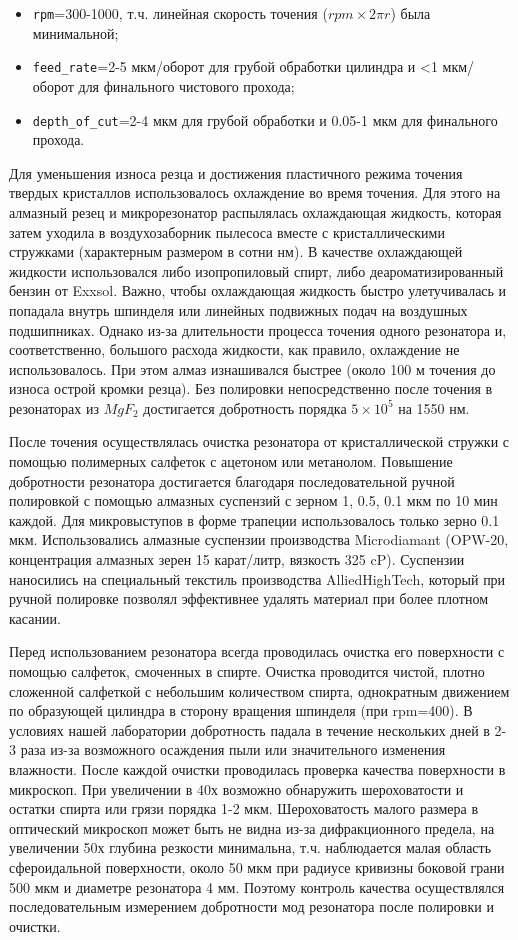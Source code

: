 \begin{itemize}
    \item \texttt{rpm}=300-1000, т.ч. линейная скорость точения ($rpm\times 2\pi r$) была минимальной;
    \item \texttt{feed\_rate}=2-5 мкм/оборот для грубой обработки цилиндра и <1 мкм/оборот для финального чистового прохода;
    \item \texttt{depth\_of\_cut}=2-4 мкм для грубой обработки и 0.05-1 мкм для финального прохода.
\end{itemize}

Для уменьшения износа резца и достижения пластичного режима точения твердых кристаллов использовалось охлаждение во время точения. Для этого на алмазный резец и микрорезонатор распылялась охлаждающая жидкость, которая затем уходила в воздухозаборник пылесоса вместе с кристаллическими стружками (характерным размером в сотни нм). В качестве охлаждающей жидкости использовался либо изопропиловый спирт, либо деароматизированный бензин от Exxsol. Важно, чтобы охлаждающая жидкость быстро улетучивалась и попадала внутрь шпинделя или линейных подвижных подач на воздушных подшипниках. Однако из-за длительности процесса точения одного резонатора и, соответственно, большого расхода жидкости, как правило, охлаждение не использовалось. При этом алмаз изнашивался быстрее (около 100 м точения до износа острой кромки резца). Без полировки непосредственно после точения в резонаторах из $MgF_2$ достигается добротность порядка $5\times10^5$ на 1550 нм.

После точения осуществлялась очистка резонатора от кристаллической стружки с помощью полимерных салфеток с ацетоном или метанолом. Повышение добротности резонатора достигается благодаря последовательной ручной полировкой с помощью алмазных суспензий с зерном 1, 0.5, 0.1 мкм по 10 мин каждой. Для микровыступов в форме трапеции использовалось только зерно 0.1 мкм. Использовались алмазные суспензии производства Microdiamant (OPW-20, концентрация алмазных зерен 15 карат/литр, вязкость 325 cP). Суспензии наносились на специальный текстиль производства AlliedHighTech, который при ручной полировке позволял эффективнее удалять материал при более плотном касании.
 
Перед использованием резонатора всегда проводилась очистка его поверхности с помощью салфеток, смоченных в спирте. Очистка проводится чистой, плотно сложенной салфеткой с небольшим количеством спирта, однократным движением по образующей цилиндра в сторону вращения шпинделя (при rpm=400). В условиях нашей лаборатории добротность падала в течение нескольких дней в 2-3 раза из-за возможного осаждения пыли или значительного изменения влажности. После каждой очистки проводилась проверка качества поверхности в микроскоп. При увеличении в 40х возможно обнаружить шероховатости и остатки спирта или грязи порядка 1-2 мкм. Шероховатость малого размера в оптический микроскоп может быть не видна из-за дифракционного предела, на увеличении 50х глубина резкости минимальна, т.ч. наблюдается малая область сфероидальной поверхности, около 50 мкм при радиусе кривизны боковой грани 500 мкм и диаметре резонатора 4 мм. Поэтому контроль качества осуществлялся последовательным измерением добротности мод резонатора после полировки и очистки.

